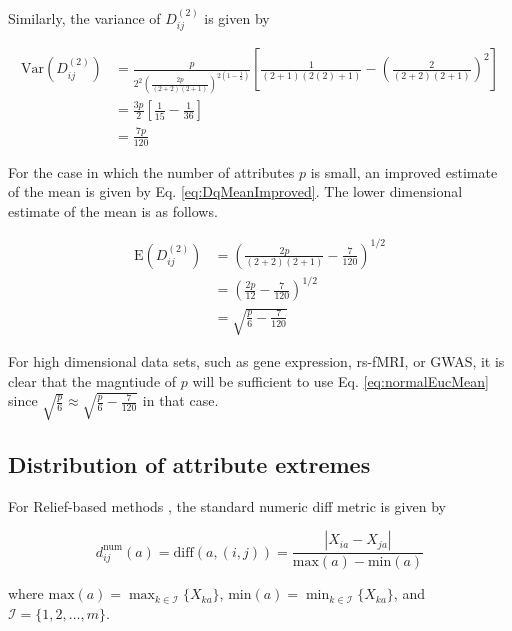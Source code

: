\documentclass[10pt,letterpaper]{article}\usepackage[]{graphicx}\usepackage[]{color}
\begin{document}
Similarly, the variance of $D^{(2)}_{ij}$ is given by

\begin{equation}\label{eq:uniformEucVar}
\begin{aligned}
\text{Var}\left(D^{(2)}_{ij}\right) &= \frac{p}{2^2\left(\frac{2p}{(2 + 2)(2 + 1)}\right)^{2\left(1 - \frac{1}{2}\right)}}\left[\frac{1}{(2 + 1)(2(2) + 1)} - \left(\frac{2}{(2 + 2)(2 + 1)}\right)^2\right] \\
&= \frac{3p}{2}\left[\frac{1}{15} - \frac{1}{36}\right] \\
&= \frac{7p}{120}
\end{aligned}
\end{equation}

For the case in which the number of attributes $p$ is small, an improved estimate of the mean is given by Eq. \ref{eq:DqMeanImproved}. The lower dimensional estimate of the mean is as follows.

\begin{equation}\label{eq:uniformEucMeanImproved}
\begin{aligned}
\text{E}\left(D^{(2)}_{ij}\right) &= \left(\frac{2p}{(2+2)(2+1)} - \frac{7}{120}\right)^{1/2} \\
&= \left(\frac{2p}{12} - \frac{7}{120}\right)^{1/2} \\
&= \sqrt{\frac{p}{6} - \frac{7}{120}}
\end{aligned}
\end{equation}

For high dimensional data sets, such as gene expression, rs-fMRI, or GWAS, it is clear that the magntiude of $p$ will be sufficient to use Eq. \ref{eq:normalEucMean} since $\sqrt{\frac{p}{6}} \approx \sqrt{\frac{p}{6} - \frac{7}{120}}$ in that case.

\subsection{Distribution of attribute extremes}

For Relief-based methods \cite{robnik2003,urbanowiczReliefReview2018}, the standard numeric diff metric is given by

\begin{equation}\label{eq:normDiff}
d^{\text{num}}_{ij}(a) = \text{diff}(a,(i,j)) = \frac{|X_{ia} - X_{ja}|}{\text{max}(a) - \text{min}(a)}
\end{equation}

\noindent where $\text{max}(a) = \displaystyle \max_{k \in \mathcal{I}}\{X_{ka}\}$, $\text{min}(a) = \displaystyle \min_{k \in \mathcal{I}}\{X_{ka}\}$, and $\mathcal{I} = \{1,2,\dots,m\}$. 
\end{document}
